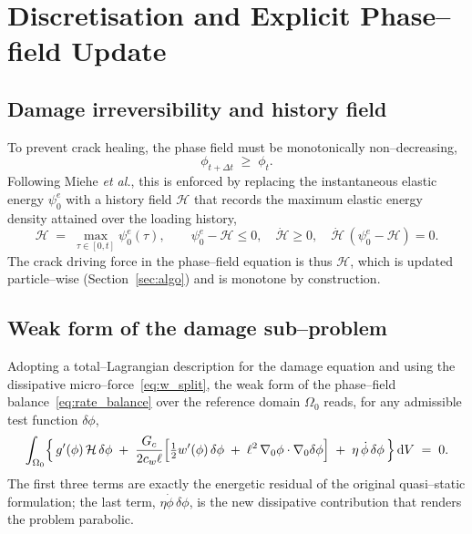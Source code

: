 \documentclass[12pt,a4paper]{article}
\newcommand{\dd}{\,\mathrm{d}}
\newcommand{\Dt}{\Delta t}
\begin{document}
	\section{Discretisation and Explicit Phase--field Update}\label{sec:disc}

	\subsection{Damage irreversibility and history field}

	To prevent crack healing, the phase field must be monotonically
	non--decreasing,
	\begin{equation}\label{eq:irrev}
		\phi_{t+\Dt} \;\ge\; \phi_t .
	\end{equation}
	Following Miehe \emph{et al.}, this is enforced by replacing the instantaneous
	elastic energy $\psi^e_0$ with a history field $\mathcal{H}$ that records the
	maximum elastic energy density attained over the loading history,
	\begin{equation}\label{eq:history}
		\mathcal{H} \;=\; \max_{\tau\in[0,t]}\psi^e_0(\tau),
		\qquad
		\psi^e_0-\mathcal{H}\le 0,\quad \dot{\mathcal{H}}\ge 0,\quad \dot{\mathcal{H}}\,(\psi^e_0-\mathcal{H})=0 .
	\end{equation}
	The crack driving force in the phase--field equation is thus $\mathcal{H}$, which
	is updated particle--wise (Section~\ref{sec:algo}) and is monotone by
	construction.

	\subsection{Weak form of the damage sub--problem}

	Adopting a total--Lagrangian description for the damage equation and using
	the dissipative micro--force~\eqref{eq:w_split}, the weak form of the
	phase--field balance~\eqref{eq:rate_balance} over the reference domain
	$\Omega_0$ reads, for any admissible test function $\delta\phi$,
	\begin{equation}\label{eq:weak_pf}
		\int_{\Omega_0}\Bigl\{\,g'(\phi)\,\mathcal{H}\,\delta\phi
		\;+\; \frac{G_c}{2c_w\ell}\Bigl[\tfrac{1}{2}w'(\phi)\,\delta\phi
		\;+\; \ell^2\,\nabla_0\phi\cdot\nabla_0\delta\phi\Bigr]
		\;+\; \eta\,\dot{\phi}\,\delta\phi\,\Bigr\}\dd V \;=\; 0 .
	\end{equation}
	The first three terms are exactly the energetic residual of the original
	quasi--static formulation; the last term, $\eta\dot\phi\,\delta\phi$, is the new
	dissipative contribution that renders the problem parabolic.
\end{document}

